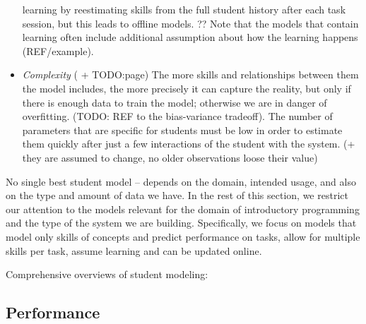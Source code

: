 \begin{itemize}
learning by reestimating skills from the full student history after each task
session, but this leads to offline models.
?? Note that the models that contain learning often include additional assumption
about how the learning happens (REF/example).
\item \emph{Complexity} (\cite{pelanek-learner-modeling} + TODO:page)
The more skills and relationships between them the model includes,
the more precisely it can capture the reality, but only
if there is enough data to train the model; otherwise we are in danger of
overfitting. (TODO: REF to the bias-variance tradeoff).
The number of parameters that are specific for students must be low in order to
estimate them quickly after just a few interactions of the student with the system.
(+ they are assumed to change, no older observations loose their value)
\end{itemize}

No single best student model -- depends on the domain, intended usage, and also
on the type and amount of data we have.
In the rest of this section, we restrict our attention to the models relevant
for the domain of introductory programming and the type of the system we
are building. Specifically, we focus on models that
model only skills of concepts and predict performance on tasks,
allow for multiple skills per task,
assume learning and can be updated online.

Comprehensive overviews of student modeling:
\cite{its-learner-models, student-models-review-2012, pelanek-learner-modeling}

\subsection{Performance}

